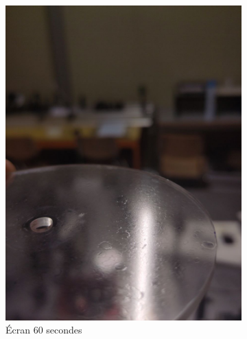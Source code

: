 \begin{figure}[H]
  \centering
  \begin{subfigure}{.5\textwidth}
    \centering
    \includegraphics[width=1\linewidth]{assets/figures/mesures/60_sec.jpeg}
    \caption{Écran 60 secondes}
  \end{subfigure}%
  \begin{subfigure}{.5\textwidth}
    \centering

\end{subfigure}
\end{figure}
